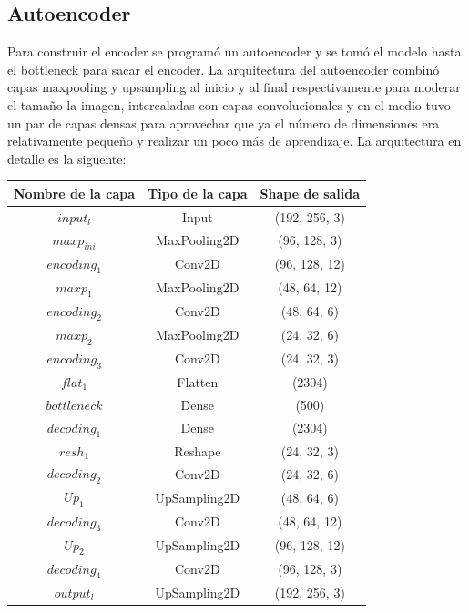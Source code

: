 \documentclass[colorinlistoftodos,twoside,twocolumn,10pt]{article} %
\begin{document}
	\subsection{Autoencoder}
Para construir el encoder se programó un autoencoder y se tomó el modelo hasta el bottleneck para sacar el encoder. La arquitectura del autoencoder combinó capas maxpooling y upsampling al inicio y al final respectivamente para moderar el tamaño la imagen, intercaladas con capas convolucionales y en el medio tuvo un par de capas densas para aprovechar que ya el número de dimensiones era relativamente pequeño y realizar un poco más de aprendizaje. La arquitectura en detalle es la siguente:
\begin{center}
  \begin{tabular}{ | c | c | c |}
    \hline
    \textbf{Nombre de la capa} & \textbf{Tipo de la capa} & \textbf{Shape de salida} \\ \hline
    $input_l$ & Input & (192, 256, 3) \\ \hline
    $maxp_{ini}$ & MaxPooling2D & (96, 128, 3) \\ \hline
    $encoding_1$ & Conv2D & (96, 128, 12) \\ \hline
    $maxp_1$ & MaxPooling2D & (48, 64, 12) \\ \hline
    $encoding_2$ & Conv2D & (48, 64, 6) \\ \hline
    $maxp_2$ & MaxPooling2D & (24, 32, 6) \\ \hline
    $encoding_3$ & Conv2D & (24, 32, 3) \\ \hline
    $flat_1$ & Flatten & (2304) \\ \hline
    $bottleneck$ & Dense & (500) \\ \hline
    $decoding_1$ & Dense & (2304) \\ \hline
    $resh_1$ & Reshape & (24, 32, 3) \\ \hline
    $decoding_2$ & Conv2D & (24, 32, 6) \\ \hline
    $Up_1$ & UpSampling2D & (48, 64, 6) \\ \hline
    $decoding_3$ & Conv2D & (48, 64, 12) \\ \hline
    $Up_2$ & UpSampling2D & (96, 128, 12) \\ \hline
    $decoding_4$ & Conv2D & (96, 128, 3) \\ \hline
    $output_l$ & UpSampling2D & (192, 256, 3) \\
    \hline
  \end{tabular}
\end{center}
\end{document}
